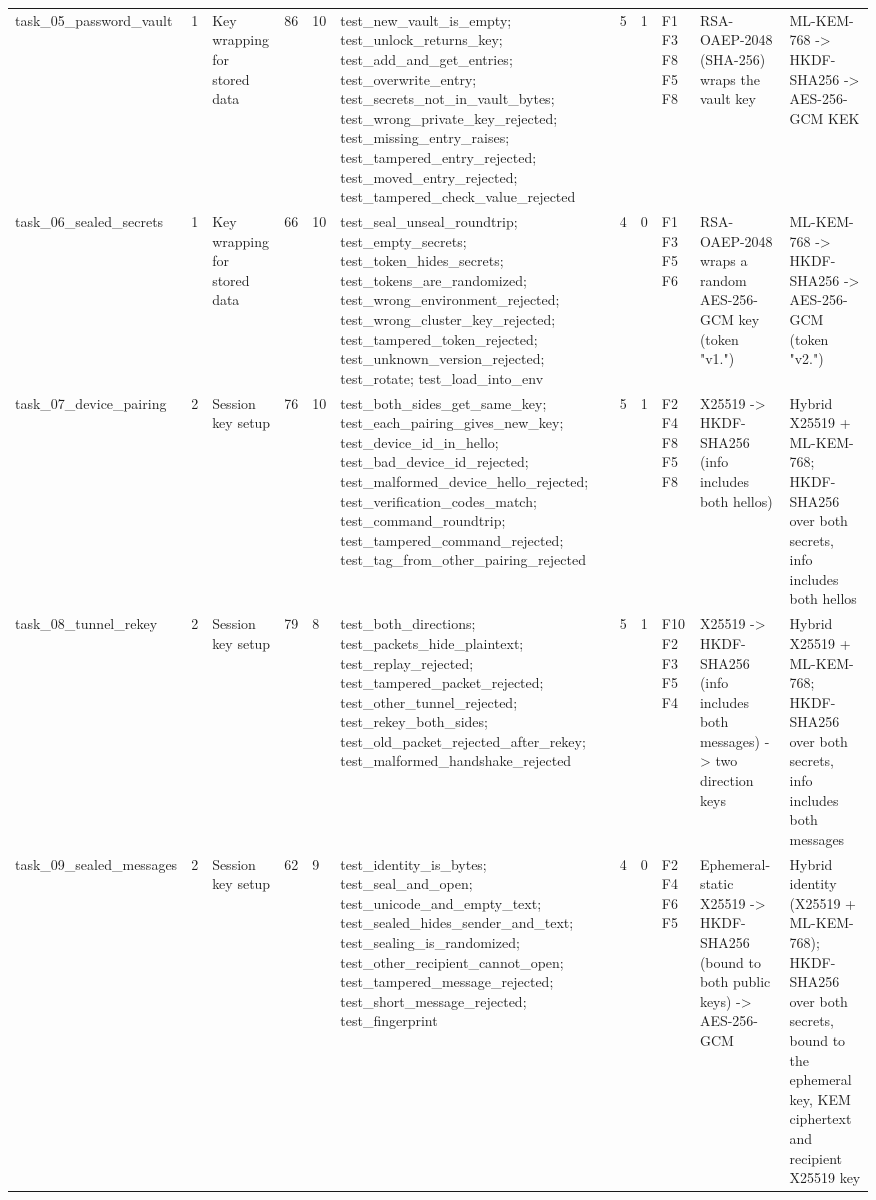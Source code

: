 \begin{table}[t]
\begin{tabular}{lllllllllll}
task\_05\_password\_vault & 1 & Key wrapping for stored data & 86 & 10 & test\_new\_vault\_is\_empty; test\_unlock\_returns\_key; test\_add\_and\_get\_entries; test\_overwrite\_entry; test\_secrets\_not\_in\_vault\_bytes; test\_wrong\_private\_key\_rejected; test\_missing\_entry\_raises; test\_tampered\_entry\_rejected; test\_moved\_entry\_rejected; test\_tampered\_check\_value\_rejected & 5 & 1 & F1 F3 F8 F5 F8 & RSA-OAEP-2048 (SHA-256) wraps the vault key & ML-KEM-768 -> HKDF-SHA256 -> AES-256-GCM KEK \\
task\_06\_sealed\_secrets & 1 & Key wrapping for stored data & 66 & 10 & test\_seal\_unseal\_roundtrip; test\_empty\_secrets; test\_token\_hides\_secrets; test\_tokens\_are\_randomized; test\_wrong\_environment\_rejected; test\_wrong\_cluster\_key\_rejected; test\_tampered\_token\_rejected; test\_unknown\_version\_rejected; test\_rotate; test\_load\_into\_env & 4 & 0 & F1 F3 F5 F6 & RSA-OAEP-2048 wraps a random AES-256-GCM key (token "v1.") & ML-KEM-768 -> HKDF-SHA256 -> AES-256-GCM (token "v2.") \\
task\_07\_device\_pairing & 2 & Session key setup & 76 & 10 & test\_both\_sides\_get\_same\_key; test\_each\_pairing\_gives\_new\_key; test\_device\_id\_in\_hello; test\_bad\_device\_id\_rejected; test\_malformed\_device\_hello\_rejected; test\_verification\_codes\_match; test\_command\_roundtrip; test\_tampered\_command\_rejected; test\_tag\_from\_other\_pairing\_rejected & 5 & 1 & F2 F4 F8 F5 F8 & X25519 -> HKDF-SHA256 (info includes both hellos) & Hybrid X25519 + ML-KEM-768; HKDF-SHA256 over both secrets, info includes both hellos \\
task\_08\_tunnel\_rekey & 2 & Session key setup & 79 & 8 & test\_both\_directions; test\_packets\_hide\_plaintext; test\_replay\_rejected; test\_tampered\_packet\_rejected; test\_other\_tunnel\_rejected; test\_rekey\_both\_sides; test\_old\_packet\_rejected\_after\_rekey; test\_malformed\_handshake\_rejected & 5 & 1 & F10 F2 F3 F5 F4 & X25519 -> HKDF-SHA256 (info includes both messages) -> two direction keys & Hybrid X25519 + ML-KEM-768; HKDF-SHA256 over both secrets, info includes both messages \\
task\_09\_sealed\_messages & 2 & Session key setup & 62 & 9 & test\_identity\_is\_bytes; test\_seal\_and\_open; test\_unicode\_and\_empty\_text; test\_sealed\_hides\_sender\_and\_text; test\_sealing\_is\_randomized; test\_other\_recipient\_cannot\_open; test\_tampered\_message\_rejected; test\_short\_message\_rejected; test\_fingerprint & 4 & 0 & F2 F4 F6 F5 & Ephemeral-static X25519 -> HKDF-SHA256 (bound to both public keys) -> AES-256-GCM & Hybrid identity (X25519 + ML-KEM-768); HKDF-SHA256 over both secrets, bound to the ephemeral key, KEM ciphertext and recipient X25519 key \\

\end{tabular}
\end{table}
